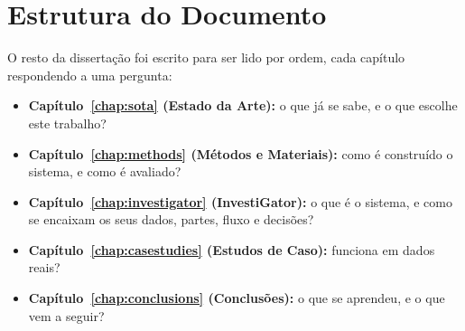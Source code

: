 \section{Estrutura do Documento}
\label{sec:intro_structure}

O resto da dissertação foi escrito para ser lido por ordem, cada capítulo respondendo a uma pergunta:

\begin{itemize}
  \item \textbf{Capítulo~\ref{chap:sota} (Estado da Arte):} o que já se sabe, e o que escolhe este trabalho?
  \item \textbf{Capítulo~\ref{chap:methods} (Métodos e Materiais):} como é construído o sistema, e como é
        avaliado?
  \item \textbf{Capítulo~\ref{chap:investigator} (InvestiGator):} o que é o sistema, e como se encaixam os
        seus dados, partes, fluxo e decisões?
  \item \textbf{Capítulo~\ref{chap:casestudies} (Estudos de Caso):} funciona em dados reais?
  \item \textbf{Capítulo~\ref{chap:conclusions} (Conclusões):} o que se aprendeu, e o que vem a seguir?
\end{itemize}

